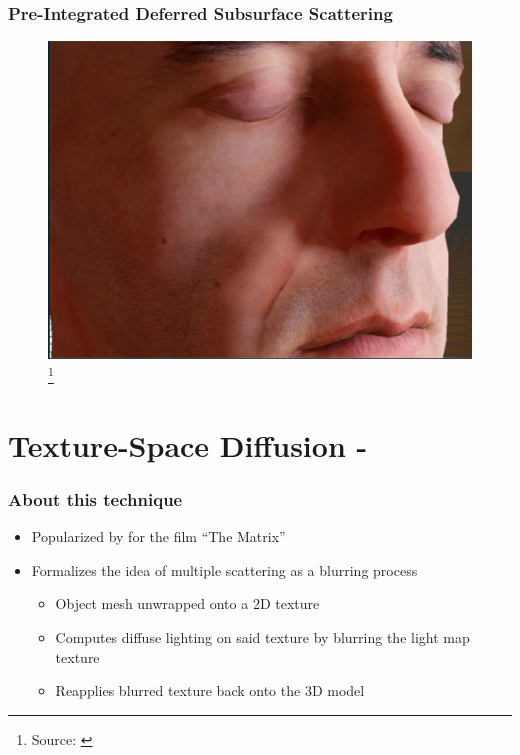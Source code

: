 \documentclass{f4_beamer_metropolis}
\newcommand\blfootnote[1]{%
  \begingroup
  \renewcommand\thefootnote{}\footnote{#1}%
  \addtocounter{footnote}{-1}%
  \endgroup
}
\begin{document}
\begin{frame}[t]
  \frametitle{Pre-Integrated Deferred Subsurface Scattering}
  \begin{figure}[!h]
    \centering
    \includegraphics[scale=0.2,keepaspectratio]{./images/pre-integrated-ss.jpg}
    \blfootnote{Source: \citet{pre-integrated-subsurface}}
  \end{figure}

\end{frame}

\section{Texture-Space Diffusion - \citet{efficient-human-skin-rendering}}

\begin{frame}[t]
  \frametitle{About this technique}
  \begin{itemize}
    \item Popularized by \citet{realistic-human-face-rendering-matrix} for the film \enquote{The Matrix}
    \item Formalizes the idea of multiple scattering as a blurring process
    \begin{itemize}
      \item Object mesh unwrapped onto a 2D texture
      \item Computes diffuse lighting on said texture by blurring the light map texture
      \item Reapplies blurred texture back onto the 3D model
    \end{itemize}
  \end{itemize}

\end{frame}
\end{document}
